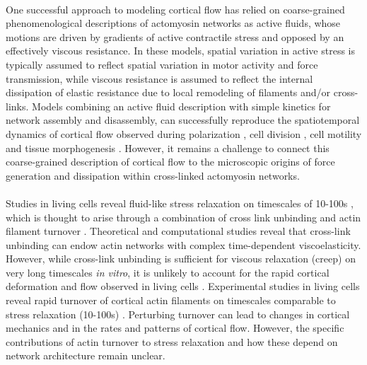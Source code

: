 \documentclass[10pt,letterpaper]{article}
\begin{document}
\paragraph{}  One successful approach to modeling cortical flow has relied on coarse-grained phenomenological descriptions of actomyosin networks as active fluids, whose motions are driven by gradients of active contractile stress and opposed by an effectively viscous resistance\cite{cellmech_flows}.  In these models, spatial variation in active stress is typically assumed to reflect spatial variation in motor activity and force transmission\cite{PhysRevLett.106.028103}, while viscous resistance is assumed to reflect the internal dissipation of elastic resistance due to local remodeling of filaments and/or cross-links\cite{Salbreux2012536, De-La-Cruz:2015aa}. Models combining an active fluid description with simple kinetics for network assembly and disassembly, can successfully reproduce the spatiotemporal dynamics of cortical flow observed during polarization \cite{cellmech_flows}, cell division \cite{Turlier2014114,PhysRevLett.103.058102}, cell motility \cite{Keren:2009aa,RevModPhys.85.1143} and tissue morphogenesis \cite{Behrndt257}. However, it remains a challenge to connect this coarse-grained description of cortical flow to the microscopic origins of force generation and dissipation within cross-linked actomyosin networks.  

\paragraph{} Studies in living cells reveal fluid-like stress relaxation on timescales of 10-100s \cite{cellmech_flows,cellmech_flows2,cellmech_flows3,rheo_fluid,rheo_fluid2,cell_rheo_exp}, which is thought to arise through a combination of cross link unbinding and actin filament turnover \cite{De-La-Cruz:2015aa,De-La-Cruz:2009aa,Salbreux2012536}.  Theoretical \cite{theo_crosslinkslip1,theo_crosslinkslip2} and computational \cite{model_taeyoon,rheo_crosslinkslip2,theo_crosslinkslip3} studies reveal that cross-link unbinding can endow actin networks with complex time-dependent viscoelasticity. However, while cross-link unbinding is sufficient for viscous relaxation (creep) on very long timescales {\em in vitro}, it is unlikely to account for the rapid cortical deformation and flow observed in living cells \cite{rheo_crosslinksmatter,rheo_crosslinkslip1,rheo_crosslinkslip2,rheo_crosslinkslip3,rheo_nonaffine}.  Experimental studies in living cells reveal rapid turnover of cortical actin filaments on timescales comparable to stress relaxation (10-100s) \cite{Robin:2014aa,Fritzsche:2013aa,Fritzschee1501337,Carlsson:2010aa,Lai:2008aa}.  Perturbing turnover can lead to changes in cortical mechanics and in the rates and patterns of cortical flow\cite{Van-Goor:2012aa,Fritzschee1501337}.  However, the specific contributions of actin turnover to stress relaxation and how these depend on network architecture remain unclear.   
\end{document}
